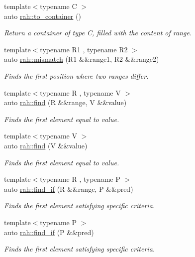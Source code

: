 \begin{DoxyCompactItemize}
{\footnotesize template$<$typename C $>$ }\\auto \mbox{\hyperlink{namespacerah_aac33763a1f49060e179c2c2053ec07a2}{rah\+::to\+\_\+container}} ()
\begin{DoxyCompactList}\small\item\em Return a container of type C, filled with the content of range. \end{DoxyCompactList}\item 
{\footnotesize template$<$typename R1 , typename R2 $>$ }\\auto \mbox{\hyperlink{namespacerah_a5ce2d92c6f0b3dd5eb6d70600e949a97}{rah\+::mismatch}} (R1 \&\&range1, R2 \&\&range2)
\begin{DoxyCompactList}\small\item\em Finds the first position where two ranges differ. \end{DoxyCompactList}\item 
{\footnotesize template$<$typename R , typename V $>$ }\\auto \mbox{\hyperlink{namespacerah_a7c7d4f08068e85923f475a069c3daeb7}{rah\+::find}} (R \&\&range, V \&\&value)
\begin{DoxyCompactList}\small\item\em Finds the first element equal to value. \end{DoxyCompactList}\item 
{\footnotesize template$<$typename V $>$ }\\auto \mbox{\hyperlink{namespacerah_a37f60e134164914703fdd0508f83ee11}{rah\+::find}} (V \&\&value)
\begin{DoxyCompactList}\small\item\em Finds the first element equal to value. \end{DoxyCompactList}\item 
{\footnotesize template$<$typename R , typename P $>$ }\\auto \mbox{\hyperlink{namespacerah_acbd71a185a2510e691dcd715a31edf53}{rah\+::find\+\_\+if}} (R \&\&range, P \&\&pred)
\begin{DoxyCompactList}\small\item\em Finds the first element satisfying specific criteria. \end{DoxyCompactList}\item 
{\footnotesize template$<$typename P $>$ }\\auto \mbox{\hyperlink{namespacerah_a04200b08ecdef8daf99f04c58f29e459}{rah\+::find\+\_\+if}} (P \&\&pred)
\begin{DoxyCompactList}\small\item\em Finds the first element satisfying specific criteria. \end{DoxyCompactList}\item 

\end{DoxyCompactItemize}
